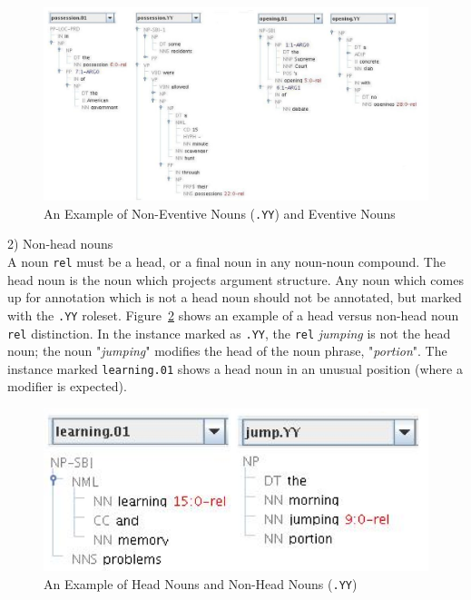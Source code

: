 \documentclass[11pt]{report}
\begin{document}
\begin{figure}[htbp]
\centering
\includegraphics[scale=0.4]{img/nenouns.png}
\caption{An Example of Non-Eventive Nouns (\texttt{.YY}) and Eventive Nouns}
\label{fig: nenouns}
\end{figure}

2) Non-head nouns \\
\hspace*{10 mm} A noun \texttt{rel} must be a head, or a final noun in any noun-noun compound. The head noun is the noun which projects argument structure. Any noun which comes up for annotation which is not a head noun should not be annotated, but marked with the \texttt{.YY} roleset. Figure~\ref{fig: headnouns} shows an example of a head versus non-head noun \texttt{rel} distinction. In the instance marked as \texttt{.YY}, the \texttt{rel} \textit{jumping} is not the head noun; the noun "\textit{jumping}" modifies the head of the noun phrase, "\textit{portion}". The instance marked \texttt{learning.01} shows a head noun in an unusual position (where a modifier is expected). 

\begin{figure}[htbp]
\centering
\includegraphics[scale=0.4]{img/headnouns.png}
\caption{An Example of Head Nouns and Non-Head Nouns (\texttt{.YY})}
\label{fig: headnouns}
\end{figure}
\end{document}
